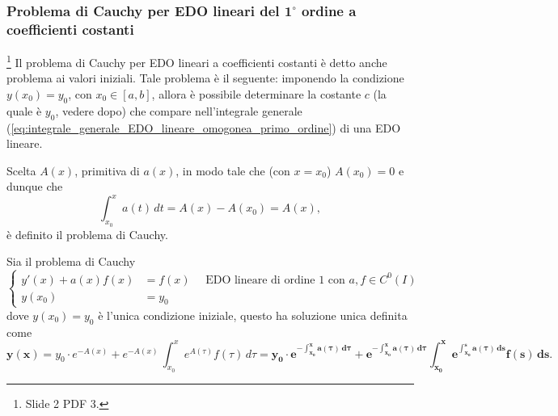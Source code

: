 \subsubsection{Problema di Cauchy per EDO lineari del \texorpdfstring{$\boldsymbol{1^{\circ}}$}{1°} ordine a coefficienti costanti}\label{ssec:problema_cauchy}

\footnote{Slide 2 PDF 3.} Il problema di Cauchy per EDO lineari a coefficienti costanti è detto anche problema ai valori iniziali. Tale problema è il seguente: imponendo la condizione $y(x_0)=y_0$, con $x_0\in[a,b]$, allora è possibile determinare la costante $c$ (la quale è $y_0$, vedere dopo) che compare nell'integrale generale (\ref{eq:integrale_generale_EDO_lineare_omogonea_primo_ordine}) di una EDO lineare.

Scelta $A(x)$, primitiva di $a(x)$, in modo tale che (con $x=x_0$) $A(x_0)=0$ e dunque che
\begin{equation}\label{eq:primitiva_problema_cauchy}
    \int_{x_0}^{x} a(t)\, dt = A(x) - A(x_0) = A(x),
\end{equation}
è definito il problema di Cauchy.
\begin{definition}
    Sia il problema di Cauchy 
    \begin{equation}\label{eq:problema_cauchy_edo_primo_ordine_coeff_costanti}
        \begin{cases}
            y'(x) + a(x)f(x)&=f(x)\quad\text{ EDO lineare di ordine 1 con $a,f\in C^0(I)$}\\
            y(x_0)&=y_0
        \end{cases}
    \end{equation}
    dove $y(x_0)=y_0$ è l'unica condizione iniziale, questo ha soluzione unica definita come
    \begin{equation}\label{eq:soluzione_problema_cauchy_primo_ordine_coeff_costanti}
        \boldsymbol{y(x)} = y_0 \cdot e^{-A(x)} + e^{-A(x)} \, \int_{x_0}^x e^{A(\tau)}f(\tau) \, d\tau = \boldsymbol{y_0 \cdot e^{-\int_{x_0}^x a(\tau)\, d\tau} + e^{-\int_{x_0}^x a(\tau)\, d\tau} \int_{x_0}^x e^{\int_{x_0}^s a(\tau)\, ds} f(s)\, ds}.
    \end{equation}
\end{definition}

